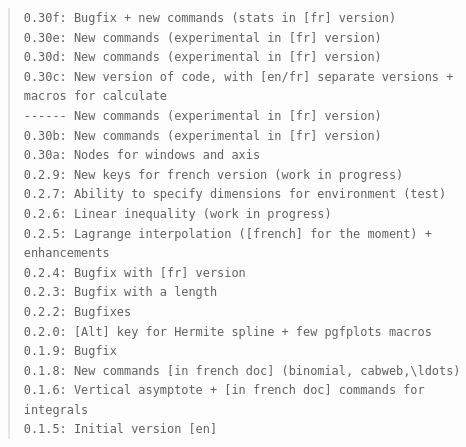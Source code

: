 \documentclass[11pt,a4paper]{ltxdoc}
\begin{document}
\begin{quote}
\begin{verbatim}
0.30f: Bugfix + new commands (stats in [fr] version)
0.30e: New commands (experimental in [fr] version)
0.30d: New commands (experimental in [fr] version)
0.30c: New version of code, with [en/fr] separate versions + macros for calculate
------ New commands (experimental in [fr] version)
0.30b: New commands (experimental in [fr] version)
0.30a: Nodes for windows and axis
0.2.9: New keys for french version (work in progress)
0.2.7: Ability to specify dimensions for environment (test)
0.2.6: Linear inequality (work in progress)
0.2.5: Lagrange interpolation ([french] for the moment) + enhancements
0.2.4: Bugfix with [fr] version
0.2.3: Bugfix with a length
0.2.2: Bugfixes
0.2.0: [Alt] key for Hermite spline + few pgfplots macros
0.1.9: Bugfix
0.1.8: New commands [in french doc] (binomial, cabweb,\ldots)
0.1.6: Vertical asymptote + [in french doc] commands for integrals
0.1.5: Initial version [en]
\end{verbatim}
\end{quote}
\end{document}
